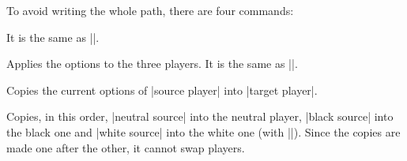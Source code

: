 To avoid writing the whole path, there are four commands:

\begin{command}{\pgfgosetplayer{}}
	It is the same as ||.
\end{command}

\begin{command}{\pgfgosetallplayers{}}
	Applies the options to the three players. It is the same as ||.

	\begin{codeexample}[width=4cm]

		\begin{goban}[3]
		\end{goban}
	\end{codeexample}
\end{command}

\begin{command}{\pgfgocopyplayer{}}
	Copies the current options of |source player| into |target player|.

	\begin{codeexample}[width=3cm]

		\begin{goban}[partial = A1:C3]
		\end{goban}
	\end{codeexample}
\end{command}

\begin{command}{\pgfgocopyplayers{}}
	Copies, in this order, |neutral source| into the neutral player, |black source| into the black one and |white source| into the white one (with |\pgfgocopyplayer|). Since the copies are made one after the other, it cannot swap players.

	\begin{codeexample}[width=4cm]

		\begin{goban}[3]
		\end{goban}
	\end{codeexample}
\end{command}

